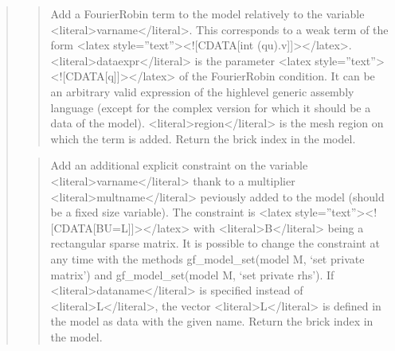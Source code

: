 \documentclass[a4paper,11pt,english]{sphinxmanual}
\begin{document}
\begin{quote}
\sphinxAtStartPar
{}
\begin{quote}

\sphinxAtStartPar
Add a Fourier\sphinxhyphen{}Robin term to the model relatively to the variable
\textless{}literal\textgreater{}varname\textless{}/literal\textgreater{}. This corresponds to a weak term of the form
\textless{}latex style=”text”\textgreater{}\textless{}!{[}CDATA{[}int (qu).v{]}{]}\textgreater{}\textless{}/latex\textgreater{}. \textless{}literal\textgreater{}dataexpr\textless{}/literal\textgreater{} is the parameter \textless{}latex style=”text”\textgreater{}\textless{}!{[}CDATA{[}q{]}{]}\textgreater{}\textless{}/latex\textgreater{} of
the Fourier\sphinxhyphen{}Robin condition.  It can be an arbitrary valid expression
of the high\sphinxhyphen{}level generic assembly language (except for the complex version
for which it should be a data of the model). \textless{}literal\textgreater{}region\textless{}/literal\textgreater{} is the mesh region
on which the term is added. Return the brick index in the model.
\end{quote}

\sphinxAtStartPar
{}
\begin{quote}

\sphinxAtStartPar
Add an additional explicit constraint on the variable \textless{}literal\textgreater{}varname\textless{}/literal\textgreater{} thank to
a multiplier \textless{}literal\textgreater{}multname\textless{}/literal\textgreater{} peviously added to the model (should be a fixed
size variable). The constraint is \textless{}latex style=”text”\textgreater{}\textless{}!{[}CDATA{[}BU=L{]}{]}\textgreater{}\textless{}/latex\textgreater{}
with \textless{}literal\textgreater{}B\textless{}/literal\textgreater{} being a rectangular sparse matrix. It is possible to change
the constraint at any time with the methods gf\_model\_set(model M, ‘set private matrix’)
and gf\_model\_set(model M, ‘set private rhs’). If \textless{}literal\textgreater{}dataname\textless{}/literal\textgreater{} is specified instead of \textless{}literal\textgreater{}L\textless{}/literal\textgreater{},
the vector \textless{}literal\textgreater{}L\textless{}/literal\textgreater{} is defined in the model as data with the given name.
Return the brick index in the model.
\end{quote}


\end{quote}
\end{document}
